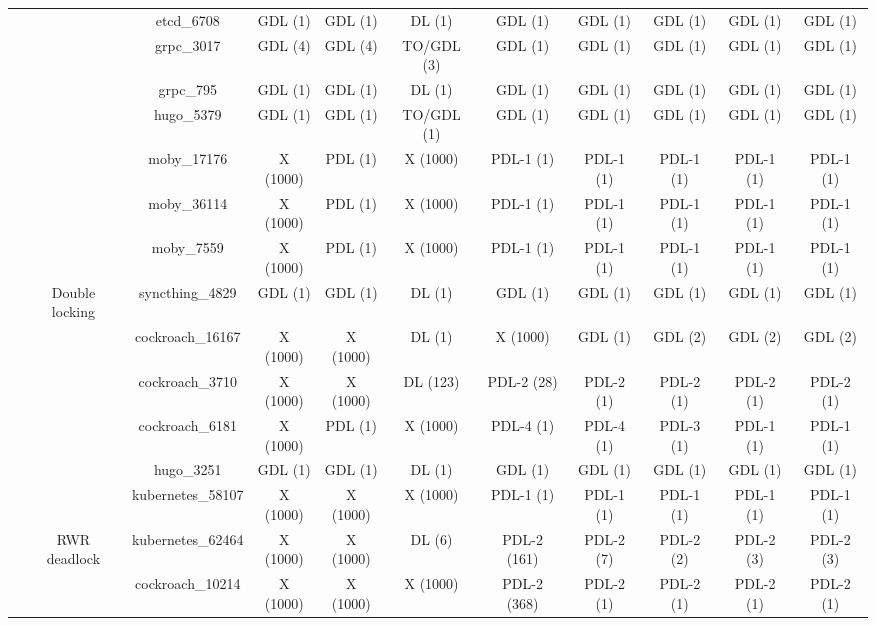 \begin{tabular}{|c|c|c|ccc|ccccc|}
 &  & etcd\_6708 & GDL (1) & GDL (1) & DL (1) & GDL (1) & GDL (1) & GDL (1) & GDL (1) & GDL (1) \\ \cline{3-3}
 &  & grpc\_3017 & GDL (4) & GDL (4) & TO/GDL (3) & GDL (1) & GDL (1) & GDL (1) & GDL (1) & GDL (1) \\ \cline{3-3}
 &  & grpc\_795 & GDL (1) & GDL (1) & DL (1) & GDL (1) & GDL (1) & GDL (1) & GDL (1) & GDL (1) \\ \cline{3-3}
 &  & hugo\_5379 & GDL (1) & GDL (1) & TO/GDL (1) & GDL (1) & GDL (1) & GDL (1) & GDL (1) & GDL (1) \\ \cline{3-3}
 &  & moby\_17176 & X (1000) & PDL (1) & X (1000) & PDL-1 (1) & PDL-1 (1) & PDL-1 (1) & PDL-1 (1) & PDL-1 (1) \\ \cline{3-3}
 &  & moby\_36114 & X (1000) & PDL (1) & X (1000) & PDL-1 (1) & PDL-1 (1) & PDL-1 (1) & PDL-1 (1) & PDL-1 (1) \\ \cline{3-3}
 &  & moby\_7559 & X (1000) & PDL (1) & X (1000) & PDL-1 (1) & PDL-1 (1) & PDL-1 (1) & PDL-1 (1) & PDL-1 (1) \\ \cline{3-3}
 & \multirow{-12}{*}{Double locking} & syncthing\_4829 & GDL (1) & GDL (1) & DL (1) & GDL (1) & GDL (1) & GDL (1) & GDL (1) & GDL (1) \\ \cline{2-11}
 &  & cockroach\_16167 & X (1000) & X (1000) & DL (1) & X (1000) & GDL (1) & GDL (2) & GDL (2) & GDL (2) \\ \cline{3-3}
 &  & cockroach\_3710 & X (1000) & X (1000) & DL (123) & \cellcolor[HTML]{EFEFEF}PDL-2 (28) & \cellcolor[HTML]{EFEFEF}PDL-2 (1) & \cellcolor[HTML]{EFEFEF}PDL-2 (1) & \cellcolor[HTML]{EFEFEF}PDL-2 (1) & \cellcolor[HTML]{EFEFEF}PDL-2 (1) \\ \cline{3-3}
 &  & cockroach\_6181 & X (1000) & PDL (1) & X (1000) & PDL-4 (1) & PDL-4 (1) & PDL-3 (1) & PDL-1 (1) & PDL-1 (1) \\ \cline{3-3}
 &  & hugo\_3251 & GDL (1) & GDL (1) & DL (1) & GDL (1) & GDL (1) & GDL (1) & GDL (1) & GDL (1) \\ \cline{3-3}
 &  & kubernetes\_58107 & X (1000) & X (1000) & X (1000) & \cellcolor[HTML]{EFEFEF}PDL-1 (1) & \cellcolor[HTML]{EFEFEF}PDL-1 (1) & \cellcolor[HTML]{EFEFEF}PDL-1 (1) & \cellcolor[HTML]{EFEFEF}PDL-1 (1) & \cellcolor[HTML]{EFEFEF}PDL-1 (1) \\ \cline{3-3}
 & \multirow{-6}{*}{RWR deadlock} & kubernetes\_62464 & X (1000) & X (1000) & DL (6) & PDL-2 (161) & PDL-2 (7) & PDL-2 (2) & PDL-2 (3) & PDL-2 (3) \\ \cline{2-11}
 &  & cockroach\_10214 & X (1000) & X (1000) & X (1000) & \cellcolor[HTML]{EFEFEF}PDL-2 (368) & \cellcolor[HTML]{EFEFEF}PDL-2 (1) & \cellcolor[HTML]{EFEFEF}PDL-2 (1) & \cellcolor[HTML]{EFEFEF}PDL-2 (1) & \cellcolor[HTML]{EFEFEF}PDL-2 (1) \\ \cline{3-3}

\end{tabular}
